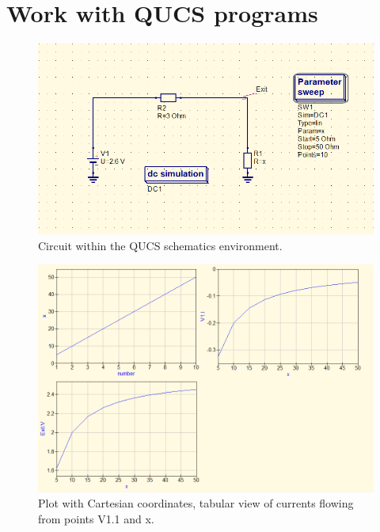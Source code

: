 \documentclass{report}
\begin{document}
\section{Work with QUCS programs}
\begin{figure}[!ht]
\centering
\includegraphics[width=.9\linewidth]{qucs1}
\caption{Circuit within the QUCS schematics environment.}
\end{figure}
\vspace*{\floatsep}
\begin{figure}[!hb]
\centering
\includegraphics[width=.9\linewidth]{qucs2}
\caption{Plot with Cartesian coordinates, tabular view of currents flowing from points V1.1 and x.}
\label{i:qucs}
\end{figure}
\end{document}
